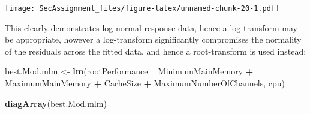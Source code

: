 \documentclass[12pt]{article}
\newenvironment{Shaded}{\begin{snugshade}}{\end{snugshade}}
\newcommand{\DataTypeTok}[1]{\textcolor[rgb]{0.13,0.29,0.53}{#1}}
\newcommand{\DecValTok}[1]{\textcolor[rgb]{0.00,0.00,0.81}{#1}}
\newcommand{\KeywordTok}[1]{\textcolor[rgb]{0.13,0.29,0.53}{\textbf{#1}}}
\newcommand{\NormalTok}[1]{#1}
\newcommand{\OperatorTok}[1]{\textcolor[rgb]{0.81,0.36,0.00}{\textbf{#1}}}
\newcommand{\StringTok}[1]{\textcolor[rgb]{0.31,0.60,0.02}{#1}}
\begin{document}
\begin{Shaded}
\end{Shaded}

\texttt{[image: SecAssignment\_files/figure-latex/unnamed-chunk-20-1.pdf]}

This clearly demonstrates log-normal response data, hence a
log-transform may be appropriate, however a log-transform significantly
compromises the normality of the residuals across the fitted data, and
hence a root-transform is used instead:

\begin{Shaded}
\begin{Highlighting}[]
\NormalTok{best.Mod.mlm <-}\StringTok{ }\KeywordTok{lm}\NormalTok{(rootPerformance }\OperatorTok{~}\StringTok{ }\NormalTok{MinimumMainMemory }\OperatorTok{+}\StringTok{ }\NormalTok{MaximumMainMemory }\OperatorTok{+}\StringTok{ }\NormalTok{CacheSize }\OperatorTok{+}\StringTok{ }\NormalTok{MaximumNumberOfChannels, cpu)}

\KeywordTok{diagArray}\NormalTok{(best.Mod.mlm)}
\end{Highlighting}
\end{Shaded}
\end{document}

